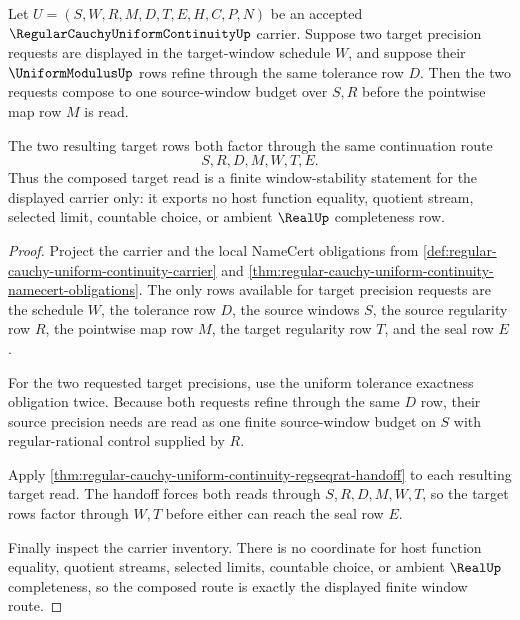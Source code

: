 \begin{theorem}
\label{thm:regular-cauchy-uniform-continuity-window-composition}
Let $U=(S,W,R,M,D,T,E,H,C,P,N)$ be an accepted $\RegularCauchyUniformContinuityUp$ carrier. Suppose two target precision requests are displayed in the target-window schedule $W$, and suppose their $\UniformModulusUp$ rows refine through the same tolerance row $D$. Then the two requests compose to one source-window budget over $S,R$ before the pointwise map row $M$ is read.

The two resulting target rows both factor through the same continuation route
$$
S,R,D,M,W,T,E.
$$
Thus the composed target read is a finite window-stability statement for the displayed carrier only: it exports no host function equality, quotient stream, selected limit, countable choice, or ambient $\RealUp$ completeness row.
\end{theorem}
\begin{proof}
Project the carrier and the local NameCert obligations from \autoref{def:regular-cauchy-uniform-continuity-carrier} and \autoref{thm:regular-cauchy-uniform-continuity-namecert-obligations}. The only rows available for target precision requests are the schedule $W$, the tolerance row $D$, the source windows $S$, the source regularity row $R$, the pointwise map row $M$, the target regularity row $T$, and the seal row $E$.

For the two requested target precisions, use the uniform tolerance exactness obligation twice. Because both requests refine through the same $D$ row, their source precision needs are read as one finite source-window budget on $S$ with regular-rational control supplied by $R$.

Apply \autoref{thm:regular-cauchy-uniform-continuity-regseqrat-handoff} to each resulting target read. The handoff forces both reads through $S,R,D,M,W,T$, so the target rows factor through $W,T$ before either can reach the seal row $E$.

Finally inspect the carrier inventory. There is no coordinate for host function equality, quotient streams, selected limits, countable choice, or ambient $\RealUp$ completeness, so the composed route is exactly the displayed finite window route.
\end{proof}



